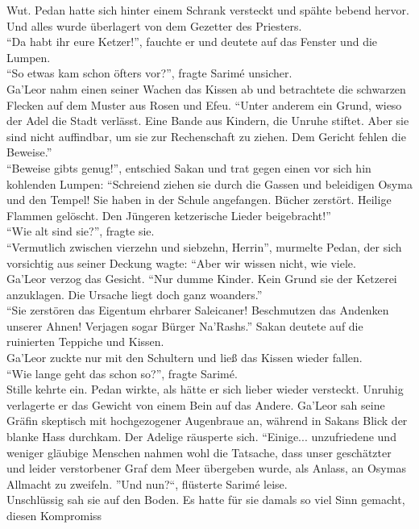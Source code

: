 Wut. Pedan hatte sich hinter einem Schrank versteckt und spähte bebend hervor. Und alles wurde 
überlagert von dem Gezetter des Priesters.\\
``Da habt ihr eure Ketzer!'', fauchte er und deutete auf das Fenster und die Lumpen.\\
``So etwas kam schon öfters vor?'', fragte Sarimé unsicher.\\
Ga'Leor nahm einen seiner Wachen das Kissen ab und betrachtete die schwarzen Flecken auf dem Muster 
aus Rosen und Efeu. ``Unter anderem ein Grund, wieso der Adel die Stadt verlässt. Eine Bande aus 
Kindern, die Unruhe stiftet. Aber sie sind nicht auffindbar, um sie zur Rechenschaft zu ziehen. Dem 
Gericht fehlen die Beweise.''\\
``Beweise gibts genug!'', entschied Sakan und trat gegen einen vor sich hin kohlenden Lumpen: 
``Schreiend ziehen sie durch die Gassen und beleidigen Osyma und den Tempel! Sie haben in der 
Schule angefangen. Bücher zerstört. Heilige Flammen gelöscht. Den Jüngeren ketzerische Lieder 
beigebracht!''\\
``Wie alt sind sie?'', fragte sie.\\
``Vermutlich zwischen vierzehn und siebzehn, Herrin'', murmelte Pedan, der sich vorsichtig aus 
seiner Deckung wagte: ``Aber wir wissen nicht, wie viele.\\
Ga'Leor verzog das Gesicht. ``Nur dumme Kinder. Kein Grund sie der Ketzerei anzuklagen. Die Ursache liegt doch ganz woanders.''\\
``Sie zerstören das Eigentum ehrbarer Saleicaner! Beschmutzen das Andenken unserer Ahnen! Verjagen 
sogar Bürger Na'Rashs.'' Sakan deutete auf die ruinierten Teppiche und Kissen.\\
Ga'Leor zuckte nur mit den Schultern und ließ das Kissen wieder fallen.\\
``Wie lange geht das schon so?'', fragte Sarimé.\\
Stille kehrte ein. Pedan wirkte, als hätte er sich lieber wieder versteckt. Unruhig verlagerte er 
das Gewicht von einem Bein auf das Andere. Ga'Leor sah seine Gräfin skeptisch mit hochgezogener Augenbraue 
an, während in Sakans Blick der blanke Hass durchkam. Der Adelige räusperte sich. ``Einige... unzufriedene und
weniger gläubige Menschen nahmen wohl die Tatsache, dass unser geschätzter und 
leider verstorbener Graf dem Meer übergeben wurde, als Anlass, an Osymas Allmacht zu zweifeln. 
''Und nun?``, flüsterte Sarimé leise.\\
Unschlüssig sah sie auf den Boden. Es hatte für sie damals so viel Sinn gemacht, diesen Kompromiss 
